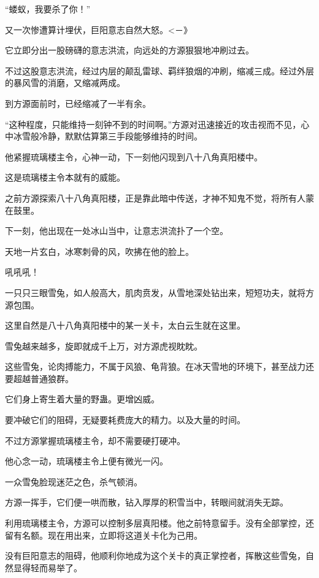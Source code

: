 
\begin{this_body}

“蝼蚁，我要杀了你！”

又一次惨遭算计埋伏，巨阳意志自然大怒。<－》

它立即分出一股磅礴的意志洪流，向远处的方源狠狠地冲刷过去。

不过这股意志洪流，经过内层的颠乱雷球、羁绊狼烟的冲刷，缩减三成。经过外层的暴风雪的消磨，又缩减两成。

到方源面前时，已经缩减了一半有余。

“这种程度，只能维持一刻钟不到的时间啊。”方源对迅速接近的攻击视而不见，心中冰雪般冷静，默默估算第三手段能够维持的时间。

他紧握琉璃楼主令，心神一动，下一刻他闪现到八十八角真阳楼中。

这是琉璃楼主令本就有的威能。

之前方源探索八十八角真阳楼，正是靠此暗中传送，才神不知鬼不觉，将所有人蒙在鼓里。

下一刻，他出现在一处冰山当中，让意志洪流扑了一个空。

天地一片玄白，冰寒刺骨的风，吹拂在他的脸上。

吼吼吼！

一只只三眼雪兔，如人般高大，肌肉贲发，从雪地深处钻出来，短短功夫，就将方源包围。

这里自然是八十八角真阳楼中的某一关卡，太白云生就在这里。

雪兔越来越多，旋即就成千上万，对方源虎视眈眈。

这些雪兔，论肉搏能力，不属于风狼、龟背狼。在冰天雪地的环境下，甚至战力还要超越普通狼群。

它们身上寄生着大量的野蛊。更增凶威。

要冲破它们的阻碍，无疑要耗费庞大的精力。以及大量的时间。

不过方源掌握琉璃楼主令，却不需要硬打硬冲。

他心念一动，琉璃楼主令上便有微光一闪。

一众雪兔脸现迷茫之色，杀气顿消。

方源一挥手，它们便一哄而散，钻入厚厚的积雪当中，转眼间就消失无踪。

利用琉璃楼主令，方源可以控制多层真阳楼。他之前特意留手。没有全部掌控，还留有名额。现在用出来，立即将这道关卡化为己用。

没有巨阳意志的阻碍，他顺利你地成为这个关卡的真正掌控者，挥散这些雪兔，自然显得轻而易举了。


\end{this_body}
